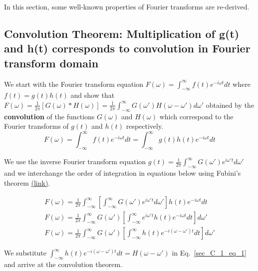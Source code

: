 \documentclass[11pt]{elsarticle}
\begin{document}
In this section, some well-known properties of Fourier transforms are re-derived.


\subsection{\label{sec:appendix_I_1} \textbf{ Convolution Theorem: Multiplication of g(t) and h(t) corresponds to convolution in Fourier transform domain} \protect\\  \lowercase{} }

We start with the Fourier transform equation $F(\omega)=  \int_{-\infty}^{\infty} f(t) e^{-i \omega t} dt$ where $f(t)=g(t) h(t)$
and show that $F(\omega)=  \frac{1}{2 \pi}  [ G(\omega) \ast H(\omega)]  = \frac{1}{2 \pi}  \int_{-\infty}^{\infty} G(\omega') H(\omega - \omega') d\omega'$ obtained by the \textbf{convolution} of the functions $G(\omega)$ and $H(\omega)$ which correspond to the Fourier transforms of $g(t)$ and $h(t)$ respectively.\\

\begin{equation} \label{sec_C_1_eq_0}   
F(\omega)=  \int_{-\infty}^{\infty} f(t) e^{-i \omega t} dt = \int_{-\infty}^{\infty} g(t) h(t) e^{-i\omega t} dt 
\end{equation}

We use the inverse Fourier transform equation  $g(t)=  \frac{1}{2 \pi} \int_{-\infty}^{\infty} G(\omega') e^{i \omega' t} d\omega' $ and we interchange the order of integration in equations below using Fubini's theorem \href{https://en.m.wikipedia.org/wiki/Convolution_theorem}{(link)}.

\begin{eqnarray*}\label{sec_C_1_eq_1}   
F(\omega)=  \frac{1}{2 \pi}  \int_{-\infty}^{\infty} [  \int_{-\infty}^{\infty} G(\omega') e^{i \omega' t} d\omega' ] h(t) e^{-i\omega t} dt \\
F(\omega)=  \frac{1}{2 \pi}  \int_{-\infty}^{\infty} G(\omega')  [ \int_{-\infty}^{\infty}  e^{i \omega' t}   h(t) e^{-i\omega t} dt ] d\omega' \\
F(\omega)=  \frac{1}{2 \pi}  \int_{-\infty}^{\infty} G(\omega')  [ \int_{-\infty}^{\infty}   h(t) e^{-i(\omega- \omega') t} dt ] d\omega'
\end{eqnarray*}
\begin{equation} \end{equation}

We substitute $\int_{-\infty}^{\infty}   h(t) e^{-i(\omega- \omega') t} dt  = H(\omega - \omega')$ in Eq.~\ref{sec_C_1_eq_1} and arrive at the convolution theorem.
\end{document}
